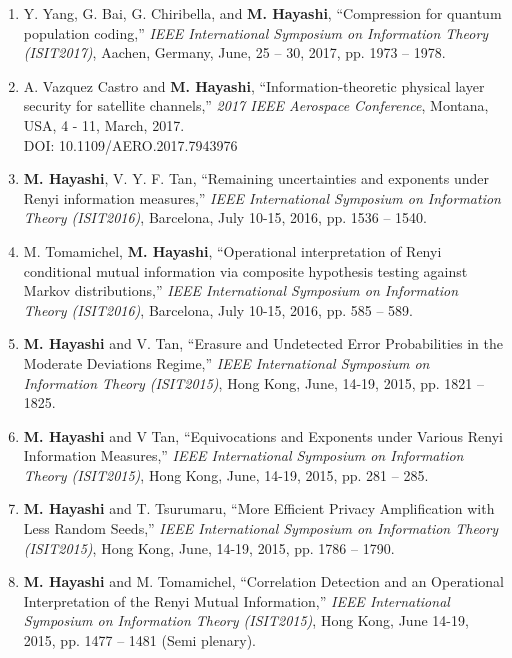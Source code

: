 \documentclass[a4paper,12pt,oneside]{article}
\begin{document}
\begin{enumerate}
\item 
Y. Yang, G. Bai, G. Chiribella, and \textbf{M. Hayashi},
``Compression for quantum population coding,''
{\em IEEE International Symposium on Information Theory (ISIT2017)}, 
Aachen, Germany, June, 25 -- 30, 2017, pp. 1973 -- 1978.

\item 
A. Vazquez Castro and \textbf{M. Hayashi}, ``Information-theoretic physical layer security for satellite channels,'' 
{\em 2017 IEEE Aerospace Conference}, Montana, USA, 4 - 11, March, 2017.\\
DOI: 10.1109/AERO.2017.7943976

\item 
\textbf{M. Hayashi}, V. Y. F. Tan, ``Remaining uncertainties and exponents under Renyi information measures,'' 
{\em IEEE International Symposium on Information Theory (ISIT2016)}, 
Barcelona, July 10-15, 2016, pp. 1536 -- 1540.

\item 
M. Tomamichel, \textbf{M. Hayashi}, ``Operational interpretation of Renyi conditional mutual information via composite hypothesis testing against Markov distributions,'' 
{\em IEEE International Symposium on Information Theory (ISIT2016)}, 
Barcelona, July 10-15, 2016, pp. 585 -- 589.

\item 
\textbf{M. Hayashi} and V. Tan, 
``Erasure and Undetected Error Probabilities in the Moderate Deviations Regime,'' 
{\em IEEE International Symposium on Information Theory (ISIT2015)},
Hong Kong, June, 14-19, 2015, pp. 1821 -- 1825.

\item 
\textbf{M. Hayashi} and V Tan, 
``Equivocations and Exponents under Various Renyi Information Measures,'' 
{\em IEEE International Symposium on Information Theory (ISIT2015)},
Hong Kong, June, 14-19, 2015, pp. 281 -- 285.

\item 
\textbf{M. Hayashi} and T. Tsurumaru, 
``More Efficient Privacy Amplification with Less Random Seeds,'' 
{\em IEEE International Symposium on Information Theory (ISIT2015)},
Hong Kong, June, 14-19, 2015, pp. 1786 -- 1790.

\item 
\textbf{M. Hayashi} and M. Tomamichel, 
``Correlation Detection and an Operational Interpretation of the Renyi Mutual Information,'' 
{\em IEEE International Symposium on Information Theory (ISIT2015)},
Hong Kong, June 14-19, 2015, pp. 1477 -- 1481 (Semi plenary).


\end{enumerate}
\end{document}
